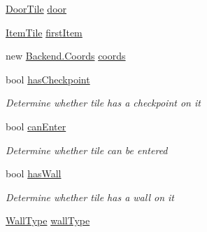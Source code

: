 \begin{DoxyCompactItemize}
\item 
\hyperlink{class_gruppe22_1_1_backend_1_1_door_tile}{Door\-Tile} \hyperlink{class_gruppe22_1_1_backend_1_1_floor_tile_a42b9b51aaeb0118ee2cc1ae5f0d4d29f}{door}
\item 
\hyperlink{class_gruppe22_1_1_backend_1_1_item_tile}{Item\-Tile} \hyperlink{class_gruppe22_1_1_backend_1_1_floor_tile_af1b9c44771c17dd815b3386d66a09329}{first\-Item}
\item 
new \hyperlink{class_gruppe22_1_1_backend_1_1_coords}{Backend.\-Coords} \hyperlink{class_gruppe22_1_1_backend_1_1_floor_tile_a222af0c5d8ea6b7d24d04a384f71d70b}{coords}
\item 
bool \hyperlink{class_gruppe22_1_1_backend_1_1_floor_tile_a4dc2e696b9103c702ebbf5a8f898f99d}{has\-Checkpoint}
\begin{DoxyCompactList}\small\item\em Determine whether tile has a checkpoint on it \end{DoxyCompactList}\item 
bool \hyperlink{class_gruppe22_1_1_backend_1_1_floor_tile_a07516e27f9669dd9e852cf42a1a94635}{can\-Enter}
\begin{DoxyCompactList}\small\item\em Determine whether tile can be entered \end{DoxyCompactList}\item 
bool \hyperlink{class_gruppe22_1_1_backend_1_1_floor_tile_ad5e7dcc45afdb6acf6eca5510ae38049}{has\-Wall}
\begin{DoxyCompactList}\small\item\em Determine whether tile has a wall on it \end{DoxyCompactList}\item 
\hyperlink{namespace_gruppe22_1_1_backend_ab19de7e2856537f39fbd380beea6ddba}{Wall\-Type} \hyperlink{class_gruppe22_1_1_backend_1_1_floor_tile_af235974bebb657c12a310521c1e8293d}{wall\-Type}
\item 

\end{DoxyCompactItemize}
